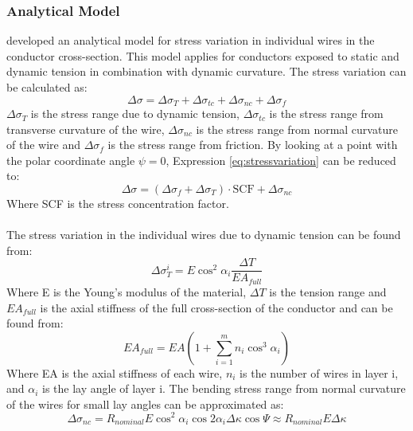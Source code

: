 \subsubsection{Analytical Model} \cite{s300} developed an analytical model for stress variation in individual wires in the conductor cross-section. This model applies for conductors exposed to static and dynamic tension in combination with dynamic curvature. The stress variation can be calculated as:   
\begin{equation}
    \Delta \sigma = \Delta \sigma_T + \Delta \sigma_{tc} + \Delta \sigma_{nc} + \Delta \sigma_{f}
    \label{eq:stressvariation}
\end{equation}
\noindentWhere $\Delta \sigma_T$ is the stress range due to dynamic tension, $\Delta \sigma_{tc}$ is the stress range from transverse curvature of the wire, $\Delta \sigma_{nc}$ is the stress range from normal curvature of the wire and $\Delta \sigma_{f}$ is the stress range from friction. By looking at a point with the polar coordinate angle $\psi = 0$, Expression \ref{eq:stressvariation} can be reduced to:
\begin{equation}
    \Delta \sigma = (\Delta \sigma_f + \Delta \sigma_{T})\cdot \text{SCF} + \Delta \sigma_{nc}
    \label{eq:stressvariationred}
\end{equation}Where SCF is the stress concentration factor. \\\\The stress variation in the individual wires due to dynamic tension can be found from:
\begin{equation}
    \Delta \sigma_T^i = E \cos^2 \alpha_i \frac{\Delta T}{E A_{full}} 
    \label{eq:sigmaT}
\end{equation}
\noindent Where E is the Young's modulus of the material, $\Delta T$ is the tension range and $EA_{full}$  is the axial stiffness of the full cross-section of the conductor and can be found from:
\begin{equation}
    EA_{full}=EA \left( 1+\sum_{i=1}^m n_i \cos^3\alpha_i \right)
\end{equation}
\noindent Where EA is the axial stiffness of each wire, $n_i$ is the number of wires in layer i, and $\alpha_i$ is the lay angle of layer i. \newline
\newline
The bending stress range from normal curvature of the wires for small lay angles can be approximated as:
\begin{equation}
    \Delta \sigma_{nc} = R_{nominal} E \cos^2 \alpha_i \cos2 \alpha_i \Delta \kappa \cos \Psi \approx R_{nominal}E \Delta \kappa
\end{equation}
